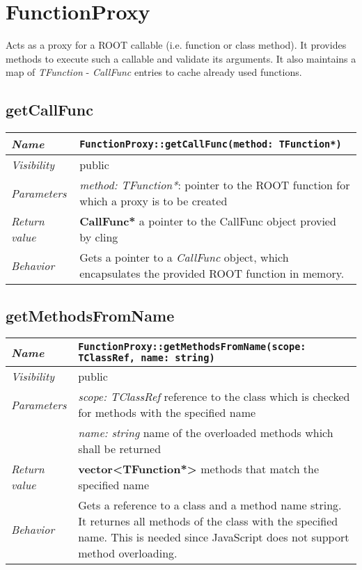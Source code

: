 \chapter{FunctionProxy}
	Acts as a proxy for a ROOT callable (i.e. function or class method). It provides methods to execute such a callable and validate its arguments. It also maintains a map of \textit{TFunction} - \textit{CallFunc} entries to cache already used functions.

\section{getCallFunc}
\begin{longtable}{p{3cm} @{\hskip 1cm} p{12cm}}
	\hline

	\textit{Name} & \texttt{FunctionProxy::getCallFunc(method: TFunction*)}\\
	\hline

	\textit{Visibility} & public\\
	\hline

	\textit{Parameters} &  \textit{method: TFunction*}: pointer to the ROOT function for which a proxy 
							is to be created\\
	\hline

	\textit{Return value} & \textbf{CallFunc*} a pointer to the CallFunc object provied by cling\\
	\hline

	\textit{Behavior} & Gets a pointer to a \textit{CallFunc} object, which encapsulates the provided ROOT function in memory.\\
	\hline

\end{longtable} 

\section{getMethodsFromName}
\begin{longtable}{p{3cm} @{\hskip 1cm} p{12cm}}
	\hline

	\textit{Name} & \texttt{FunctionProxy::getMethodsFromName(scope: TClassRef, name: string)}\\
	\hline

	\textit{Visibility} & public\\
	\hline

	\textit{Parameters} & \textit{scope: TClassRef} reference to the class which is checked for methods with the specified name\\
		& \textit{name: string} name of the overloaded methods which shall be returned\\
	\hline

	\textit{Return value} & \textbf{vector<TFunction*>} methods that match the specified name\\
	\hline

	\textit{Behavior} & Gets a reference to a class and a method name string. It returnes all methods of the class with the specified name. This is needed since JavaScript does not support method overloading.\\
	\hline

\end{longtable}
\pagebreak

